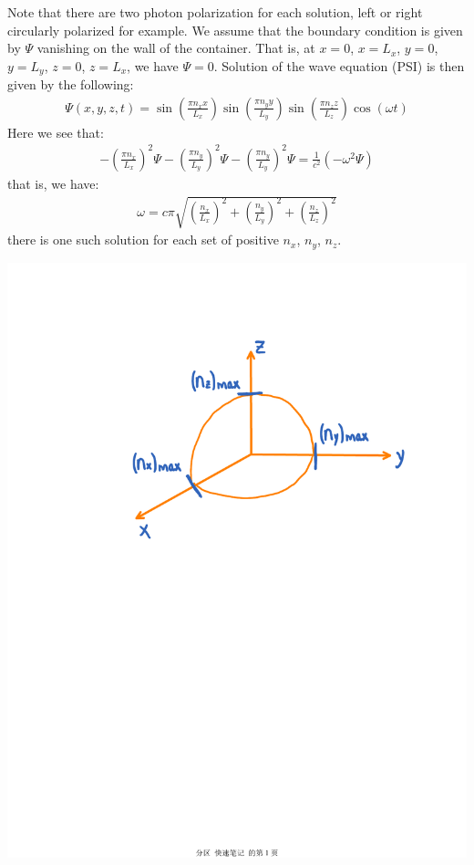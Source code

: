 \documentclass[11pt,oneside]{book}
\theoremstyle{break}
\theoremstyle{break}
\newcommand{\lr}[1]{\left( #1 \right)}
\begin{document}
Note that there are two photon polarization for each solution, left or right circularly polarized for example. We assume that the boundary condition is given by $\Psi$ vanishing on the wall of the container. That is, at $x = 0$, $x= L_x$, $y = 0$, $y = L_y$, $z = 0$, $z = L_x$, we have $\Psi= 0$. Solution of the wave equation (PSI) is then given by the following:
\begin{align*}
\Psi (x,y,z,t) = \sin\left( \frac{\pi n_x x}{L_x}\right) \sin\left( \frac{\pi n_y y}{L_y}\right) \sin\left( \frac{\pi n_z z}{L_z}\right) \cos(\omega t)
\end{align*}
Here we see that:
\begin{align*}
-\left( \frac{\pi n_x}{L_x}\right)^2 \Psi-\left( \frac{\pi n_y}{L_y}\right)^2 \Psi-\left( \frac{\pi n_y}{L_y}\right)^2 \Psi = \frac{1}{c^2} \left( -\omega^2 \Psi\right)
\end{align*}
that is, we have:
\begin{align*}
\omega = c\pi \sqrt{\lr{\frac{n_x}{L_x}}^2+\lr{\frac{n_y}{L_y}}^2+\lr{\frac{n_z}{L_z}}^2}
\end{align*}
there is one such solution for each set of positive $n_x$, $n_y$, $n_z$.
\begin{center}
\includegraphics[scale=0.5]{octant.pdf}
\end{center}
\end{document}
